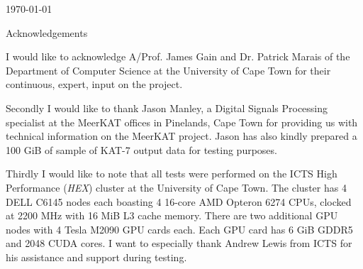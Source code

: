 \begin{titlepage}


{\large \today}\\[3cm] %


 

\vfill %

\end{titlepage}

\begin{center} 
  {\LARGE Acknowledgements}
\end{center}
\vspace{50pt}

I would like to acknowledge A/Prof. James Gain and Dr. Patrick Marais of the Department of Computer Science at the University of Cape Town for their continuous, expert, input on the project.

Secondly I would like to thank Jason Manley, a Digital Signals Processing specialist at the MeerKAT offices in Pinelands, Cape Town for providing us with technical information
on the MeerKAT project. Jason has also kindly prepared a 100 GiB of sample of KAT-7 output data for testing purposes.

Thirdly I would like to note that all tests were performed on the ICTS High Performance (\textit{HEX}) cluster at the University of Cape Town. The cluster has 4 DELL C6145 nodes each boasting 4 16-core
AMD Opteron 6274 CPUs, clocked at 2200 MHz with 16 MiB L3 cache memory. There are two additional GPU nodes with 4 Tesla M2090 GPU cards each. Each GPU card has 6 GiB GDDR5 and 2048 CUDA cores. I want to 
especially thank Andrew Lewis from ICTS for his assistance and support during testing.

